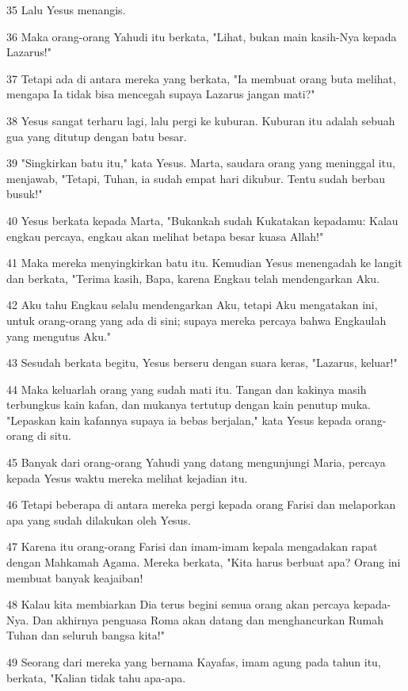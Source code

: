 \par 35 Lalu Yesus menangis.
\par 36 Maka orang-orang Yahudi itu berkata, "Lihat, bukan main kasih-Nya kepada Lazarus!"
\par 37 Tetapi ada di antara mereka yang berkata, "Ia membuat orang buta melihat, mengapa Ia tidak bisa mencegah supaya Lazarus jangan mati?"
\par 38 Yesus sangat terharu lagi, lalu pergi ke kuburan. Kuburan itu adalah sebuah gua yang ditutup dengan batu besar.
\par 39 "Singkirkan batu itu," kata Yesus. Marta, saudara orang yang meninggal itu, menjawab, "Tetapi, Tuhan, ia sudah empat hari dikubur. Tentu sudah berbau busuk!"
\par 40 Yesus berkata kepada Marta, "Bukankah sudah Kukatakan kepadamu: Kalau engkau percaya, engkau akan melihat betapa besar kuasa Allah!"
\par 41 Maka mereka menyingkirkan batu itu. Kemudian Yesus menengadah ke langit dan berkata, "Terima kasih, Bapa, karena Engkau telah mendengarkan Aku.
\par 42 Aku tahu Engkau selalu mendengarkan Aku, tetapi Aku mengatakan ini, untuk orang-orang yang ada di sini; supaya mereka percaya bahwa Engkaulah yang mengutus Aku."
\par 43 Sesudah berkata begitu, Yesus berseru dengan suara keras, "Lazarus, keluar!"
\par 44 Maka keluarlah orang yang sudah mati itu. Tangan dan kakinya masih terbungkus kain kafan, dan mukanya tertutup dengan kain penutup muka. "Lepaskan kain kafannya supaya ia bebas berjalan," kata Yesus kepada orang-orang di situ.
\par 45 Banyak dari orang-orang Yahudi yang datang mengunjungi Maria, percaya kepada Yesus waktu mereka melihat kejadian itu.
\par 46 Tetapi beberapa di antara mereka pergi kepada orang Farisi dan melaporkan apa yang sudah dilakukan oleh Yesus.
\par 47 Karena itu orang-orang Farisi dan imam-imam kepala mengadakan rapat dengan Mahkamah Agama. Mereka berkata, "Kita harus berbuat apa? Orang ini membuat banyak keajaiban!
\par 48 Kalau kita membiarkan Dia terus begini semua orang akan percaya kepada-Nya. Dan akhirnya penguasa Roma akan datang dan menghancurkan Rumah Tuhan dan seluruh bangsa kita!"
\par 49 Seorang dari mereka yang bernama Kayafas, imam agung pada tahun itu, berkata, "Kalian tidak tahu apa-apa.
